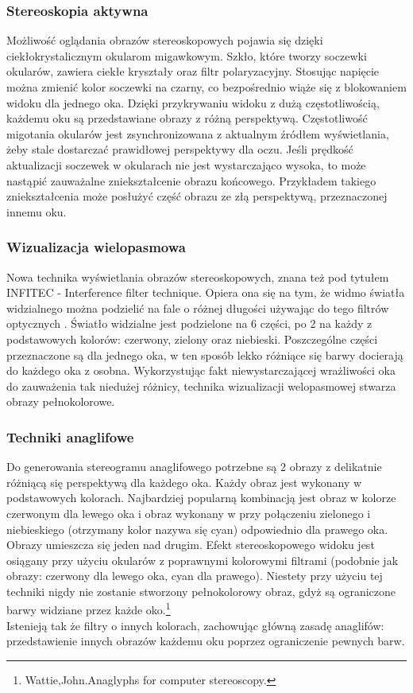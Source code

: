 \subsubsection{Stereoskopia aktywna} 
Możliwość oglądania obrazów stereoskopowych pojawia się dzięki ciekłokrystalicznym okularom migawkowym. Szkło, które tworzy soczewki okularów, zawiera ciekłe kryształy oraz filtr polaryzacyjny. Stosując napięcie można zmienić kolor soczewki na czarny, co bezpośrednio wiąże się z blokowaniem widoku dla jednego oka. Dzięki przykrywaniu widoku z dużą częstotliwością, każdemu oku są przedstawiane obrazy z różną perspektywą. Częstotliwość migotania okularów jest zsynchronizowana z aktualnym źródłem wyświetlania, żeby stale dostarczać prawidłowej perspektywy dla oczu. Jeśli prędkość aktualizacji soczewek w okularach nie jest wystarczająco wysoka, to może nastąpić zauważalne zniekształcenie obrazu końcowego. Przykładem takiego zniekształcenia może posłużyć część obrazu ze złą perspektywą, przeznaczonej innemu oku. 

\subsubsection{Wizualizacja wielopasmowa}
Nowa technika wyświetlania obrazów stereoskopowych, znana też pod tytułem INFITEC - Interference filter technique. Opiera ona się na tym, że widmo światła widzialnego można podzielić na fale o różnej długości używając do tego filtrów optycznych \cite{infitec}.
 Światło widzialne jest podzielone na 6 części, po 2 na każdy z podstawowych kolorów: czerwony, zielony oraz niebieski. Poszczególne części przeznaczone są dla jednego oka, w ten sposób lekko różniące się barwy docierają do każdego oka z osobna. Wykorzystując fakt niewystarczającej wrażliwości oka do zauważenia tak niedużej różnicy, technika wizualizacji welopasmowej stwarza obrazy pełnokolorowe.  

\subsubsection{Techniki anaglifowe}
Do generowania stereogramu anaglifowego potrzebne są 2 obrazy z delikatnie różniącą się perspektywą dla każdego oka. Każdy obraz jest wykonany w podstawowych kolorach. Najbardziej popularną kombinacją jest obraz w kolorze czerwonym dla lewego oka i obraz wykonany w przy połączeniu zielonego i niebieskiego (otrzymany kolor nazywa się cyan) odpowiednio dla prawego oka. Obrazy umieszcza się jeden nad drugim. Efekt stereoskopowego widoku jest osiągany przy użyciu okularów z poprawnymi kolorowymi filtrami (podobnie jak obrazy: czerwony dla lewego oka, cyan dla prawego). Niestety przy użyciu tej techniki nigdy nie zostanie stworzony pełnokolorowy obraz, gdyż są ograniczone barwy widziane przez każde oko.\footnote{Wattie,John.Anaglyphs for computer stereoscopy.} \\
Istenieją tak że filtry o innych kolorach, zachowując główną zasadę anaglifów: przedstawienie innych obrazów każdemu oku poprzez ograniczenie pewnych barw. \\

